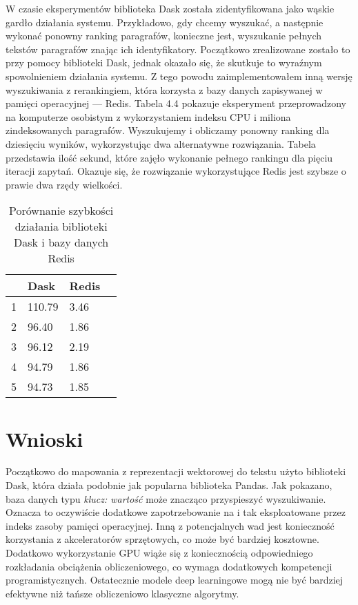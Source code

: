 W czasie eksperymentów biblioteka Dask została zidentyfikowana jako wąskie gardło działania systemu. Przykładowo, gdy chcemy wyszukać, a następnie wykonać ponowny ranking paragrafów, konieczne jest, wyszukanie pełnych tekstów paragrafów znając ich identyfikatory. Początkowo zrealizowane zostało to przy pomocy biblioteki Dask, jednak okazało się, że skutkuje to wyraźnym spowolnieniem działania systemu. Z tego powodu zaimplementowałem inną wersję wyszukiwania z rerankingiem, która korzysta z bazy danych zapisywanej w pamięci operacyjnej — Redis. Tabela 4.4 pokazuje eksperyment przeprowadzony na komputerze osobistym z wykorzystaniem indeksu CPU i miliona zindeksowanych paragrafów. Wyszukujemy i obliczamy ponowny ranking dla dziesięciu wyników, wykorzystując dwa alternatywne rozwiązania. Tabela przedstawia ilość sekund, które zajęło wykonanie pełnego rankingu dla pięciu iteracji zapytań. Okazuje się, że rozwiązanie wykorzystujące Redis jest szybsze o prawie dwa rzędy wielkości.

\begin{table}[htp]
\centering
\caption{Porównanie szybkości działania biblioteki Dask i bazy danych Redis\protect\footnotemark[1]}
\vspace*{5mm}
\begin{tabular}{llll}
\hline
  & Dask & Redis & \\
 \hline
 1 & 110.79 & 3.46 & \\
 2 & 96.40 & 1.86 & \\
 3 & 96.12 & 2.19 \\
 4 & 94.79 & 1.86 \\
 5 & 94.73 &  1.85 \\
 \hline
\end{tabular}
\end{table}


\section{Wnioski}

Początkowo do mapowania z reprezentacji wektorowej do tekstu użyto biblioteki Dask, która działa podobnie jak popularna biblioteka Pandas. Jak pokazano, baza danych typu \emph{klucz: wartość} może znacząco przyspieszyć wyszukiwanie. Oznacza to oczywiście dodatkowe zapotrzebowanie na i tak eksploatowane przez indeks zasoby pamięci operacyjnej. Inną z potencjalnych wad jest konieczność korzystania z akceleratorów sprzętowych, co może być bardziej kosztowne. Dodatkowo wykorzystanie GPU wiąże się z koniecznością odpowiedniego rozkładania obciążenia obliczeniowego, co wymaga dodatkowych kompetencji programistycznych. Ostatecznie modele deep learningowe mogą nie być bardziej efektywne niż tańsze obliczeniowo klasyczne algorytmy.\newline

